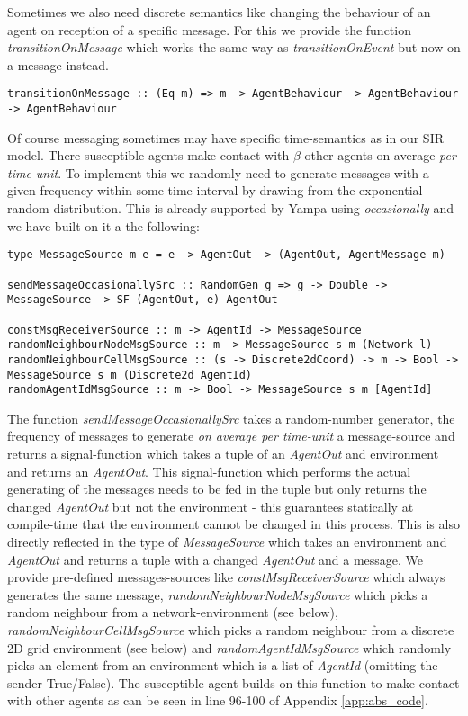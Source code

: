 Sometimes we also need discrete semantics like changing the behaviour of an agent on reception of a specific message. For this we provide the function \textit{transitionOnMessage} which works the same way as \textit{transitionOnEvent} but now on a message instead.

\begin{verbatim}
transitionOnMessage :: (Eq m) => m -> AgentBehaviour -> AgentBehaviour -> AgentBehaviour
\end{verbatim}

Of course messaging sometimes may have specific time-semantics as in our SIR model. There susceptible agents make contact with $\beta$ other agents on average \textit{per time unit}. To implement this we randomly need to generate messages with a given frequency within some time-interval by drawing from the exponential random-distribution. This is already supported by Yampa using \textit{occasionally} and we have built on it a the following:

\begin{verbatim}
type MessageSource m e = e -> AgentOut -> (AgentOut, AgentMessage m)

sendMessageOccasionallySrc :: RandomGen g => g -> Double -> MessageSource -> SF (AgentOut, e) AgentOut

constMsgReceiverSource :: m -> AgentId -> MessageSource 
randomNeighbourNodeMsgSource :: m -> MessageSource s m (Network l)
randomNeighbourCellMsgSource :: (s -> Discrete2dCoord) -> m -> Bool -> MessageSource s m (Discrete2d AgentId)
randomAgentIdMsgSource :: m -> Bool -> MessageSource s m [AgentId]
\end{verbatim}

The function \textit{sendMessageOccasionallySrc} takes a random-number generator, the frequency of messages to generate \textit{on average per time-unit} a message-source and returns a signal-function which takes a tuple of an \textit{AgentOut} and environment and returns an \textit{AgentOut}. This signal-function which performs the actual generating of the messages needs to be fed in the tuple but only returns the changed \textit{AgentOut} but not the environment - this guarantees statically at compile-time that the environment cannot be changed in this process. This is also directly reflected in the type of \textit{MessageSource} which takes an environment and \textit{AgentOut} and returns a tuple with a changed \textit{AgentOut} and a message. We provide pre-defined messages-sources like \textit{constMsgReceiverSource} which always generates the same message, \textit{randomNeighbourNodeMsgSource} which picks a random neighbour from a network-environment (see below), \textit{randomNeighbourCellMsgSource} which picks a random neighbour from a discrete 2D grid environment (see below) and \textit{randomAgentIdMsgSource} which randomly picks an element from an environment which is a list of \textit{AgentId} (omitting the sender True/False). The susceptible agent builds on this function to make contact with other agents as can be seen in line 96-100 of Appendix \ref{app:abs_code}.

